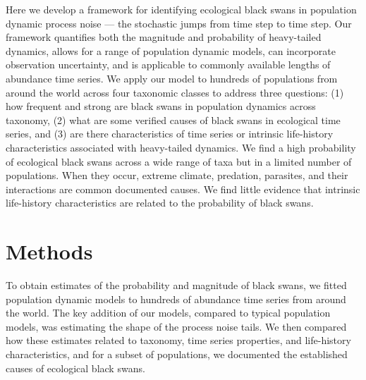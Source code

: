 Here we develop a framework for identifying ecological black swans in
population dynamic process noise --- the stochastic jumps from time step to
time step. Our framework quantifies both the magnitude and probability of
heavy-tailed dynamics, allows for a range of population dynamic models, can
incorporate observation uncertainty, and is applicable to commonly available
lengths of abundance time series. We apply our model to hundreds of populations
from around the world across four taxonomic classes to address three questions:
(1) how frequent and strong are black swans in population dynamics across
taxonomy, (2) what are some verified causes of black swans in ecological time
series, and (3) are there characteristics of time series or intrinsic
life-history characteristics associated with heavy-tailed dynamics. We find
a high probability of ecological black swans across a wide range of taxa but in
a limited number of populations. When they occur, extreme climate, predation,
parasites, and their interactions are common documented causes. We find little
evidence that intrinsic life-history characteristics are related to the
probability of black swans.


\section{Methods}

To obtain estimates of the probability and magnitude of black swans, we fitted
population dynamic models to hundreds of abundance time series from around the
world. The key addition of our models, compared to typical population models,
was estimating the shape of the process noise tails. We then compared how these
estimates related to taxonomy, time series properties, and life-history
characteristics, and for a subset of populations, we documented the established
causes of ecological black swans.

